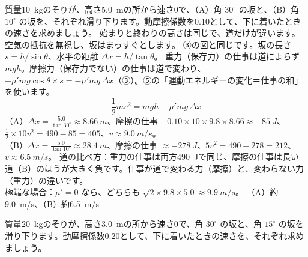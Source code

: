 \label{ph:力-4:ex12}
\begin{phreidai}
質量\qty{10}{kg}のそりが、高さ\qty{5.0}{m}の所から速さ0で、（A）角 $30^\circ$ の坂と、（B）角 $10^\circ$ の坂を、それぞれ滑り下ります。動摩擦係数を0.10として、下に着いたときの速さを求めましょう。
\phbamen
始まりと終わりの高さは同じで、道だけが違います。
\phmushi
空気の抵抗を無視し、坂はまっすぐとします。
\phzu
③の図と同じです。坂の長さ $s=h/\sin\theta$、水平の距離 $\Delta x=h/\tan\theta$。
\phriyu
重力（保存力）の仕事は道によらず $mgh$。摩擦力（保存力でない）の仕事は道で変わり、$-\mu'mg\cos\theta\times s=-\mu'mg\,\Delta x$（③）。⑤の「運動エネルギーの変化＝仕事の和」を使います。
\phtateru
\[\frac{1}{2}mv^2=mgh-\mu'mg\,\Delta x\]
\phtoku
（A）$\Delta x=\tfrac{5.0}{\tan30^\circ}\approx\qty{8.66}{m}$、摩擦の仕事 $-0.10\times10\times9.8\times8.66\approx\qty{-85}{J}$、$\tfrac{1}{2}\times10v^2=490-85=405$、$v\approx\qty{9.0}{m/s}$。\\
（B）$\Delta x=\tfrac{5.0}{\tan10^\circ}\approx\qty{28.4}{m}$、摩擦の仕事 $\approx\qty{-278}{J}$、$5v^2=490-278=212$、$v\approx\qty{6.5}{m/s}$。
\phtashikame
道の比べ方：重力の仕事は両方\qty{490}{J}で同じ、摩擦の仕事は長い道（B）のほうが大きく負です。仕事が道で変わる力（摩擦）と、変わらない力（重力）の違いです。\\
極端な場合：$\mu'=0$ なら、どちらも $\sqrt{2\times9.8\times5.0}\approx\qty{9.9}{m/s}$。
\kotae （A）約\qty{9.0}{m/s}、（B）約\qty{6.5}{m/s}
\end{phreidai}
\begin{jibun}
質量\qty{20}{kg}のそりが、高さ\qty{3.0}{m}の所から速さ0で、角 $30^\circ$ の坂と、角 $15^\circ$ の坂を滑り下ります。動摩擦係数0.20として、下に着いたときの速さを、それぞれ求めましょう。
\end{jibun}

